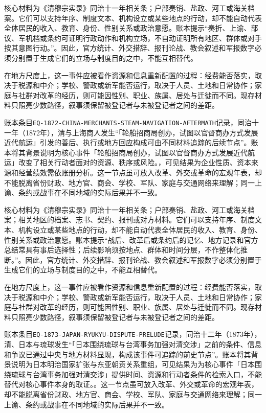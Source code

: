 核心材料为《清穆宗实录》同治十一年相关条；户部奏销、盐政、河工或海关档案。它们可以支持年序、制度文本、机构设立或某些地点的行动，却不能自动代表全体居民的收入、教育、身份、性别关系或政治意愿。账本提示“奏折、上谕、部议、军机档或条约可证明行政动作和机构立场，不自动证明所有地区、群体或对手按其意图行动。”。因此，官方统计、外交措辞、报刊论战、教会叙述和军报数字必须分别置于生成它们的立场与制度目的之中，不能互相替代。

在地方尺度上，这一事件应被看作资源和信息重新配置的过程：经费能否落实，取决于税源和中介；学校、警政或新军能否运行，取决于人员、土地和日常协作；家庭与社群对改革的经历，则可能因性别、职业、族属、居处与迁徙而不同。现存材料只照亮少数路径，叙事须保留被登记者与未被登记者之间的差距。

账本条目\texttt{EQ-1872-CHINA-MERCHANTS-STEAM-NAVIGATION-AFTERMATH}记录，同治十一年（1872年），清与上海商人发生“「轮船招商局创办，试图以官督商办方式发展近代航运」引发的善后、执行或地方回应构成可由不同材料追踪的后续节点”。账本将其背景说明为核心事件「轮船招商局创办，试图以官督商办方式发展近代航运」改变了相关行动者面对的资源、秩序或风险。，可见结果为企业性质、资本来源和经营绩效需依账册分析。这一节点虽可放入改革、外交或革命的宏观年表，却不能脱离省份财政、地方官、商会、学校、军队、家庭与交通网络来理解；同一上谕、条约或战事在不同地域的实际后果并不一致。

核心材料为《清穆宗实录》同治十一年相关条；户部奏销、盐政、河工或海关档案；相关地区的档案、志书、契约、报刊或对方材料。它们可以支持年序、制度文本、机构设立或某些地点的行动，却不能自动代表全体居民的收入、教育、身份、性别关系或政治意愿。账本提示“战后、改革后或条约后的记忆、地方记录和官方总结常具有事后选择性；后续影响须按地点、群体和时间分层，不作整体化推断。”。因此，官方统计、外交措辞、报刊论战、教会叙述和军报数字必须分别置于生成它们的立场与制度目的之中，不能互相替代。

在地方尺度上，这一事件应被看作资源和信息重新配置的过程：经费能否落实，取决于税源和中介；学校、警政或新军能否运行，取决于人员、土地和日常协作；家庭与社群对改革的经历，则可能因性别、职业、族属、居处与迁徙而不同。现存材料只照亮少数路径，叙事须保留被登记者与未被登记者之间的差距。

账本条目\texttt{EQ-1873-JAPAN-RYUKYU-DISPUTE-PRELUDE}记录，同治十二年（1873年），清、日本与琉球发生“「日本围绕琉球与台湾事务加强对清交涉」之前的条件、信息和争议已通过中央与地方材料显现，构成该事件可追踪的前史节点”。账本将其背景说明为日本明治国家扩张与东亚朝贡关系重组，可见结果为为核心事件「日本围绕琉球与台湾事务加强对清交涉」提供时间、资源和行动者条件的检索入口，不能替代对核心事件本身的取证。。这一节点虽可放入改革、外交或革命的宏观年表，却不能脱离省份财政、地方官、商会、学校、军队、家庭与交通网络来理解；同一上谕、条约或战事在不同地域的实际后果并不一致。


